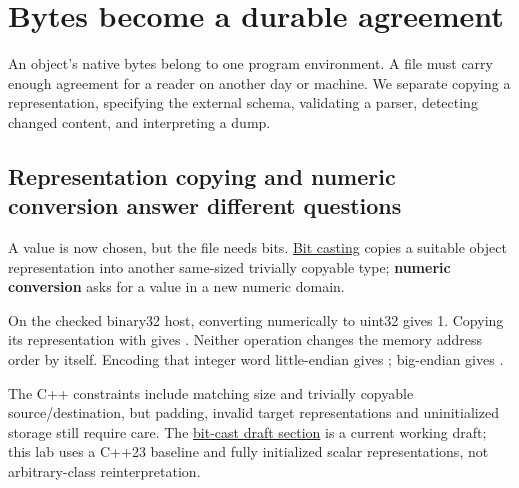 \section{Bytes become a durable agreement}\label{01-foundations-i-ch002-bytes-become-a-durable-agreement}

\hypertarget{01-foundations-i-ch002-bytes-become-a-durable-agreement}{}

An object's native bytes belong to one program environment. A file must carry enough agreement for a reader on another day or machine. We separate copying a representation, specifying the external schema, validating a parser, detecting changed content, and interpreting a dump.

\subsection{Representation copying and numeric conversion answer different questions}\label{01-foundations-i-ch002-representation-copying-and-numeric-conversion-answer-different-questions}

\hypertarget{01-foundations-i-ch002-representation-copying-and-numeric-conversion-answer-different-questions}{}

A value is now chosen, but the file needs bits. \hyperref[appendix-34ee45f161c1]{Bit casting} copies a suitable object representation into another same-sized trivially copyable type; \textbf{numeric conversion} asks for a value in a new numeric domain.

On the checked binary32 host, converting  numerically to uint32 gives 1. Copying its representation with  gives . Neither operation changes the memory address order by itself. Encoding that integer word little-endian gives ; big-endian gives .

The C++ constraints include matching size and trivially copyable source/destination, but padding, invalid target representations and uninitialized storage still require care. The \href{https://eel.is/c++draft/bit.cast}{bit-cast draft section} is a current working draft; this lab uses a C++23 baseline and fully initialized scalar representations, not arbitrary-class reinterpretation.

